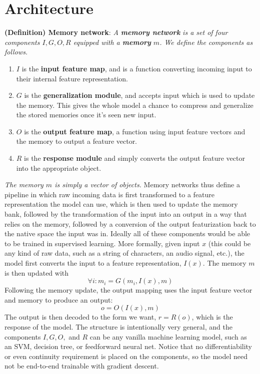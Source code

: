 \documentclass{article}
\begin{document}
\section{Architecture}
\textbf{(Definition) Memory network}: \textit{A \textbf{memory network} is a set of four components $ I, G, O, R $ equipped with a \textbf{memory} $ m $. We define the components as follows.}
\begin{enumerate}
    \item $ I $ is the \textbf{input feature map}, and is a function converting incoming input to their internal feature representation.
    \item $ G $ is the \textbf{generalization module}, and accepts input which is used to update the memory. This gives the whole model a chance to compress and generalize the stored memories once it's seen new input.
    \item $ O $ is the \textbf{output feature map}, a function using input feature vectors and the memory to output a feature vector.
    \item $ R $ is the \textbf{response module} and simply converts the output feature vector into the appropriate object.
\end{enumerate}
\indent \textit{The memory $ m $ is simply a vector of objects.}
Memory networks thus define a pipeline in which raw incoming data is first transformed to a feature representation the model can use, which is then used to update the memory bank, followed by the transformation of the input into an output in a way that relies on the memory, followed by a conversion of the output featurization back to the native space the input was in. Ideally all of these components would be able to be trained in supervised learning.
\newline
More formally, given input $ x $ (this could be any kind of raw data, such as a string of characters, an audio signal, etc.), the model first converts the input to a feature representation, $ I(x) $. The memory $ m $ is then updated with
$$ \forall i: m_i = G(m_i, I(x), m) $$
Following the memory update, the output mapping uses the input feature vector and memory to produce an output:
$$ o = O(I(x), m) $$
The output is then decoded to the form we want, $ r = R(o) $, which is the response of the model. The structure is intentionally very general, and the components $ I, G, O, $ and $ R $ can be any vanilla machine learning model, such as an SVM, decision tree, or feedforward neural net. Notice that no differentiability or even continuity requirement is placed on the components, so the model need not be end-to-end trainable with gradient descent.
\end{document}
